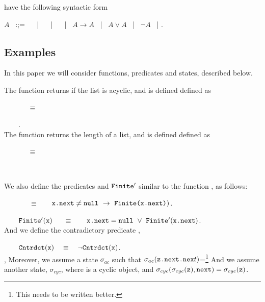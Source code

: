 \documentclass[acmsmall,screen]{acmart}
\begin{document}
\begin{definition}
[Assertions] have the following syntactic form

$A$ \ :;= \  \ | \  \ | \  \ | \ $A \rightarrow A$ \ | \ $A \vee A$ \ | \  $\neg A $ \ |  .

\end{definition}

\subsection{Examples}

In this paper we will consider  functions, predicates and states, described below.

\noindent
The function     returns 
if the list is acyclic, and is defined defined as \\
\strut \ \ \ \  \ \ $\equiv$\\
\strut \ \ \ \ {\small{}}.
\\
The function    returns the length of a list, and is defined defined as \\
\strut \ \ \ \  \ \ $\equiv$\\
\strut \ \ \ \ {\small{}}


\noindent
We also define the predicates  and  ${\mbox{\tt{Finite}}}'$ similar to the function ,  as follows:\\
\strut \ \ \ \ \ \ \ $\equiv$     \ \ \  $\prg{x.next}\neq\prg{null} \ \rightarrow\ \prg{Finite(x.next)})$.\\
\strut \ \ \ \ ${\mbox{\tt{Finite}}}'({\mbox{\tt{x}}})$\ \ \ $\equiv$     \ \ \  $\prg{x.next}=\prg{null} \ \vee\  \prg{Finite}'(\prg{x.next})$.\\
And we define  the    contradictory predicate ,\\
\strut \ \ \ \  $\prg{Cntrdct}(\prg{x})\ \ \ \equiv \ \ \ \neg \prg{Cntrdct}(\prg{x})$. \\

\noindent,
Moreover, we assume a state $\sigma_{ac}$ such that
$\sigma_{ac}({\mbox{\tt{z.next.nex}}}t)$=\footnote{This needs to be written better.}
And we assume another state,
$\sigma_{cyc}$, where  is a cyclic  object, and
$\sigma_{cyc}(\sigma_{cyc}({\mbox{\tt{z}}}),{\mbox{\tt{next}}})=\sigma_{cyc}({\mbox{\tt{z}}})$.
\end{document}
